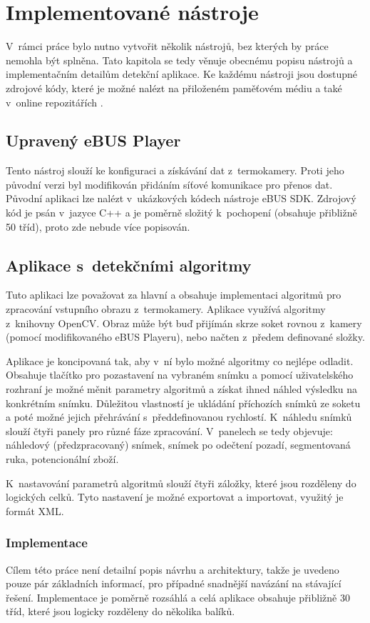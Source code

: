 \chapter{Implementované nástroje}
V~rámci práce bylo nutno vytvořit několik nástrojů, bez kterých by práce nemohla být splněna. Tato kapitola se tedy věnuje obecnému popisu nástrojů a implementačním detailům detekční aplikace. Ke každému nástroji jsou dostupné zdrojové kódy, které je možné nalézt na přiloženém paměťovém médiu a také v~online repozitářích \cite{ebusplayermod, thesisproject, flirimageviewer}. 

\section{Upravený eBUS Player}
Tento nástroj slouží ke konfiguraci a získávání dat z~termokamery. Proti jeho původní verzi byl modifikován přidáním síťové komunikace pro přenos dat. Původní aplikaci lze nalézt v~ukázkových kódech nástroje eBUS SDK. Zdrojový kód je psán v~jazyce C++ a je poměrně složitý k~pochopení (obsahuje přibližně 50 tříd), proto zde nebude více popisován.

\section{Aplikace s~detekčními algoritmy}
Tuto aplikaci lze považovat za hlavní a obsahuje implementaci algoritmů pro zpracování vstupního obrazu z~termokamery. Aplikace využívá algoritmy z~knihovny OpenCV. Obraz může být buď přijímán skrze soket rovnou z~kamery (pomocí modifikovaného eBUS Playeru), nebo načten z~předem definované složky.

Aplikace je koncipovaná tak, aby v~ní bylo možné algoritmy co nejlépe odladit. Obsahuje tlačítko pro pozastavení na vybraném snímku a pomocí uživatelského rozhraní je možné měnit parametry algoritmů a získat ihned náhled výsledku na konkrétním snímku. Důležitou vlastností je ukládání příchozích snímků ze soketu a poté možné jejich přehrávání s~předdefinovanou rychlostí. K~náhledu snímků slouží čtyři panely pro různé fáze zpracování. V~panelech se tedy objevuje: náhledový (předzpracovaný) snímek, snímek po odečtení pozadí, segmentovaná ruka, potencionální zboží. 

K~nastavování parametrů algoritmů slouží čtyři záložky, které jsou rozděleny do logických celků. Tyto nastavení je možné exportovat a importovat, využitý je formát XML.

	\subsection{Implementace}
    Cílem této práce není detailní popis návrhu a architektury, takže je uvedeno pouze pár základních informací, pro případné snadnější navázání na stávající řešení. Implementace je poměrně rozsáhlá a celá aplikace obsahuje přibližně 30 tříd, které jsou logicky rozděleny do několika balíků. 

